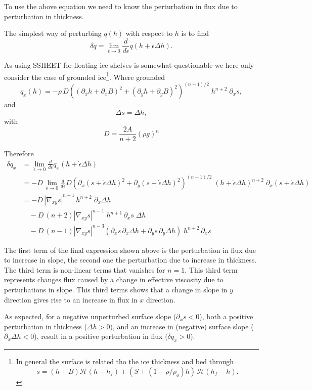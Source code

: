 \documentclass[10pt,a4paper]{book}
\newcommand{\He}{\mathcal{H}}
\newcommand{\p}{\partial}
\newcommand{\eps}{\dot{\epsilon}}
\begin{document}
To use the above equation we need to know the perturbation in flux due
to perturbation in thickness.


The simplest way of perturbing $q(h)$ with respect to $h$ is to find
\[
\delta q = \lim_{\eps \to 0} \frac{d}{d\eps} q(h+\eps \Delta h).
\]



As using SSHEET for floating ice shelves is somewhat questionable we
here only consider the case of grounded ice\footnote{In general the
  surface is related tho the ice thickness and bed through
\[
s=(h+B) \He(h-h_f)+(S+(1-\rho/\rho_o) h) \, \He(h_f-h).
\]}. Where grounded
\[
q_x(h)=-\rho \, D \left ((\p_x h+ \p_x B)^2+(\p_y h+\p_y B)^2 \right )^{(n-1)/2} \; h^{n+2} \; \p_x s,
\]
and 
\[
\Delta s= \Delta h,
\]
with 
\[
D=\frac{2 A}{n+2} (\rho g)^n 
\]

Therefore
\begin{align*}
\delta q_x & = \lim_{\eps \to 0} \frac{d}{d\eps} q_x(h+\eps \Delta h)\\
            &= - D \, \lim_{\eps \to 0} \frac{d}{d\eps} D \left ( \p_x (s+\eps \Delta h)^2 + \p_y (s+\eps \Delta h)^2 \right )^{(n-1)/2} \; (h+\eps \Delta h)^{n+2} \; \p_x (s+\eps \Delta h)\\
            &= - D \, |\nabla_{xy}s |^{n-1} \, h^{n+2} \; \p_x \Delta h \\
            &\quad - D \, (n+2) |\nabla_{xy} s|^{n-1} \; h^{n+1} \, \p_x s \; \Delta h \\
            &\quad - D \,(n-1) |\nabla_{xy} s|^{n-3}  \left ( \p_x s \, \p_x \Delta h + \p_y s \, \p_y \Delta h \right )  \; h^{n+2} \, \p_x s
\end{align*}

The first term of the final expression shown above is the perturbation
in flux due to increase in slope, the second one the perturbation due
to increase in thickness. The third term is non-linear terms that
vanishes for $n=1$. This third term represents changes flux caused by
a change in effective viscosity due to perturbations in slope. This third 
terms shows that a change in slope in $y$ direction gives rise to an
increase in flux in $x$ direction.

As expected, for a negative unperturbed surface slope ($\p_x s < 0$),
both a positive perturbation in thickness ($\Delta h>0)$, and an
increase in (negative) surface slope ($\p_x \Delta h <0 $), result in a
positive perturbation in flux ($\delta q_x>0$).
\end{document}
